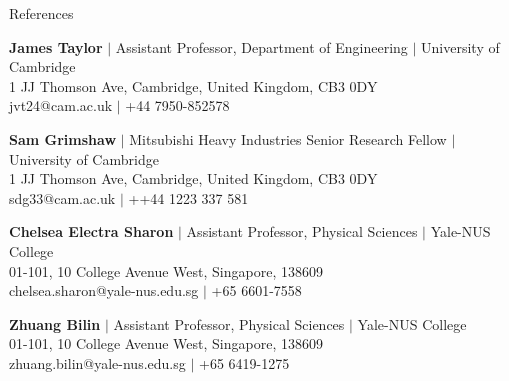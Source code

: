 \documentclass{resume} %
\begin{document}
\begin{rSection}{References}


\textbf{James Taylor} $|$ 
Assistant Professor, Department of Engineering $|$
University of Cambridge\\
1 JJ Thomson Ave, Cambridge, United Kingdom, CB3 0DY\\
jvt24@cam.ac.uk $|$ 
+44 7950-852578

\textbf{Sam Grimshaw} $|$ 
Mitsubishi Heavy Industries Senior Research Fellow $|$
University of Cambridge\\
1 JJ Thomson Ave, Cambridge, United Kingdom, CB3 0DY\\
sdg33@cam.ac.uk $|$ 
++44 1223 337 581


\textbf{Chelsea Electra Sharon} $|$
Assistant Professor, Physical Sciences $|$
Yale-NUS College\\
01-101, 10 College Avenue West, Singapore, 138609\\
chelsea.sharon@yale-nus.edu.sg $|$
+65 6601-7558


\textbf{Zhuang Bilin} $|$
Assistant Professor, Physical Sciences $|$
Yale-NUS College\\
01-101, 10 College Avenue West, Singapore, 138609\\
zhuang.bilin@yale-nus.edu.sg $|$
+65 6419-1275



\end{rSection}





\let\thefootnote\relax{}
\end{document}
